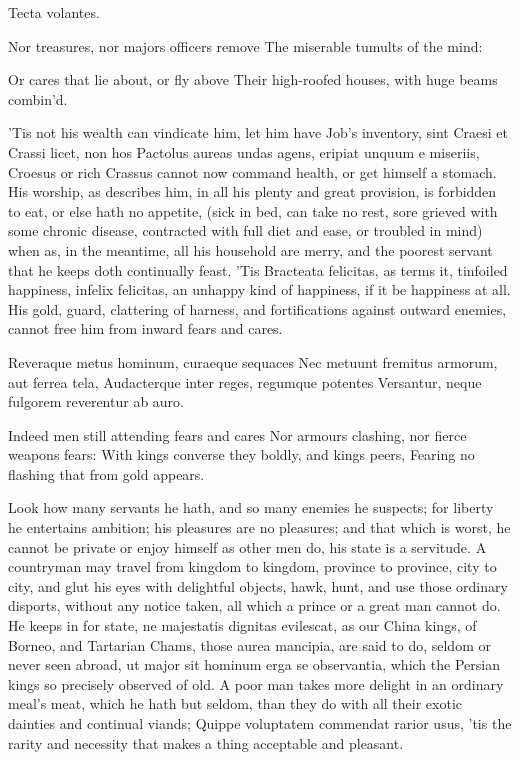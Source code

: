 {Tecta volantes.


Nor treasures, nor majors officers remove
The miserable tumults of the mind:

Or cares that lie about, or fly above
Their high-roofed houses, with huge beams combin'd.

'Tis not his wealth can vindicate him, let him have Job's inventory,
sint Craesi et Crassi licet, non hos Pactolus aureas undas agens,
eripiat unquum e miseriis, Croesus or rich Crassus cannot now command
health, or get himself a stomach. His worship, as \Apuleius
describes him, in all his plenty and great provision, is forbidden to
eat, or else hath no appetite, (sick in bed, can take no rest, sore
grieved with some chronic disease, contracted with full diet and ease,
or troubled in mind) when as, in the meantime, all his household are
merry, and the poorest servant that he keeps doth continually feast.
'Tis Bracteata felicitas, as  \Seneca terms it, tinfoiled
happiness, infelix felicitas, an unhappy kind of happiness, if it be
happiness at all. His gold, guard, clattering of harness, and
fortifications against outward enemies, cannot free him from inward
fears and cares.

Reveraque metus hominum, curaeque sequaces
Nec metuunt fremitus armorum, aut ferrea tela,
Audacterque inter reges, regumque potentes
Versantur, neque fulgorem reverentur ab auro.

Indeed men still attending fears and cares
Nor armours clashing, nor fierce weapons fears:
With kings converse they boldly, and kings peers,
Fearing no flashing that from gold appears.

Look how many servants he hath, and so many enemies he suspects; for
liberty he entertains ambition; his pleasures are no pleasures; and
that which is worst, he cannot be private or enjoy himself as other men
do, his state is a servitude. A countryman may travel from
kingdom to kingdom, province to province, city to city, and glut his
eyes with delightful objects, hawk, hunt, and use those ordinary
disports, without any notice taken, all which a prince or a great man
cannot do. He keeps in for state, ne majestatis dignitas evilescat, as
our China kings, of Borneo, and Tartarian Chams, those aurea mancipia,
are said to do, seldom or never seen abroad, ut major sit hominum erga
se observantia, which the Persian kings so precisely observed of
old. A poor man takes more delight in an ordinary meal's meat, which he
hath but seldom, than they do with all their exotic dainties and
continual viands; Quippe voluptatem commendat rarior usus, 'tis the
rarity and necessity that makes a thing acceptable and pleasant.

}
